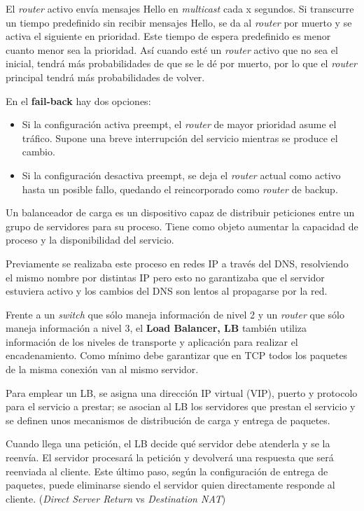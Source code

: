 El \textit{router} activo envía mensajes Hello en \textit{multicast} cada x segundos. Si transcurre un tiempo predefinido sin recibir mensajes Hello, se da al \textit{router} por muerto y se activa el siguiente en prioridad. Este tiempo de espera predefinido es menor cuanto menor sea la prioridad. Así cuando esté un \textit{router} activo que no sea el inicial, tendrá más probabilidades de que se le dé por muerto, por lo que el \textit{router} principal tendrá más probabilidades de volver.

En el \textbf{fail-back} hay dos opciones:
\begin{itemize}
\item Si la configuración activa preempt, el \textit{router} de mayor prioridad asume el tráfico. Supone una breve interrupción del servicio mientras se produce el cambio.
\item Si la configuración desactiva preempt, se deja el \textit{router} actual como activo hasta un posible fallo, quedando el reincorporado como \textit{router} de backup.
\end{itemize}

\begin{defn}\label{cluster:LB}
Un balanceador de carga es un dispositivo capaz de distribuir peticiones entre un grupo de servidores para su proceso. Tiene como objeto aumentar la capacidad de proceso y la disponibilidad del servicio.

Previamente se realizaba este proceso en redes IP a través del DNS, resolviendo el mismo nombre por distintas IP pero esto no garantizaba que el servidor estuviera activo y los cambios del DNS son lentos al propagarse por la red.

Frente a un \textit{switch} que sólo maneja información de nivel 2 y un \textit{router} que sólo maneja información a nivel 3, el \textbf{Load Balancer, LB} también utiliza información de los niveles de transporte y aplicación para realizar el encadenamiento. Como mínimo debe garantizar que en TCP todos los paquetes de la misma conexión van al mismo servidor.
\end{defn}

Para emplear un LB, se asigna una dirección IP virtual (VIP), puerto y protocolo para el servicio a prestar; se asocian al LB los servidores que prestan el servicio y se definen unos mecanismos de distribución de carga y entrega de paquetes.

Cuando llega una petición, el LB decide qué servidor debe atenderla y se la reenvía. El servidor procesará la petición y devolverá una respuesta que será reenviada al cliente. Este último paso, según la configuración de entrega de paquetes, puede eliminarse siendo el servidor quien directamente responde al cliente. (\textit{Direct Server Return} vs \textit{Destination NAT})

